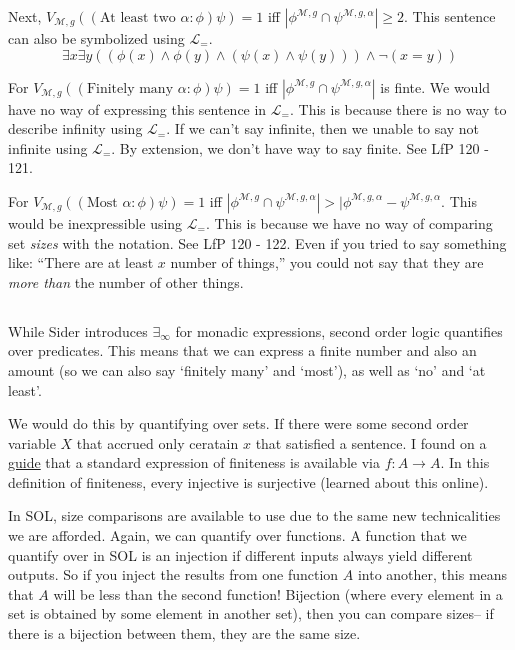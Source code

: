 \documentclass{article}
\begin{document}
    Next, $V_{\mathscr{M}, g}((\text{At least two } \alpha : \phi)\psi) = 1$ iff $|\phi^{\mathscr{M}, g} \cap \psi^{\mathscr{M}, g, \alpha}| \geq 2$.
    This sentence can also be symbolized using $\mathscr{L}_=$.
    $$\exists x \exists y ((\phi(x) \wedge \phi(y) \wedge (\psi(x) \wedge \psi(y))) \wedge \lnot(x = y))$$

    For $V_{\mathscr{M}, g}((\text{Finitely many } \alpha : \phi)\psi) = 1$ iff $|\phi^{\mathscr{M}, g} \cap \psi^{\mathscr{M}, g, \alpha}|$ is finte.
    We would have no way of expressing this sentence in $\mathscr{L}_=$. This is because there is no way to describe infinity using $\mathscr{L}_=$.
    If we can't say infinite, then we unable to say not infinite using $\mathscr{L}_=$. By extension, we don't have way to say finite. 
    See LfP 120 - 121.

    For $V_{\mathscr{M}, g}((\text{Most } \alpha : \phi)\psi) = 1$ iff $|\phi^{\mathscr{M}, g} \cap \psi^{\mathscr{M}, g, \alpha}| > |\phi^{\mathscr{M}, g, \alpha} - \psi^{\mathscr{M}, g, \alpha}$. 
    This would be inexpressible using $\mathscr{L}_=$. This is because we have no way of comparing set \textit{sizes} with the notation. See LfP 120 - 122. Even if you tried to say something like: ``There are at least $x$ number of things,'' you could not say that they are \textit{more than} the number of other things.

    \subsection{}
    While Sider introduces $\exists_\infty$ for monadic expressions, second order logic quantifies over predicates.
    This means that we can express a finite number and also an amount (so we can also say `finitely many' and `most'), as well as `no' and `at least'.
    
    We would do this by quantifying over sets. If there were some second order variable $X$ that accrued only ceratain $x$ that satisfied a sentence.
    I found on a \href{https://math.stackexchange.com/questions/4163112/expressing-finitely-many-infinitely-many-most-and-more-in-second-order}{guide} that a standard expression of finiteness  is available via $f: A\rightarrow A$.
    In this definition of finiteness, every injective is surjective (learned about this online).
    
    In SOL, size comparisons are available to use due to the same new technicalities we are afforded. Again, we can quantify over functions.
    A function that we quantify over in SOL is an injection if different inputs always yield different outputs.
    So if you inject the results from one function $A$ into another, this means that $A$ will be less than the second function! 
    Bijection (where every element in a set is obtained by some element in another set), then you can compare sizes-- if there is a bijection between them, they are the same size.
\end{document}
